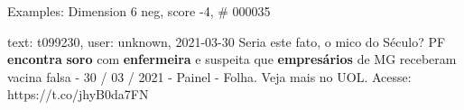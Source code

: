 \begin{frame}{Examples: Dimension 6 neg, score -4, \# 000035}
\footnotesize
\begin{alertblock}{text: t099230, user: unknown, 2021-03-30}
Seria este fato, o mico do Século? PF \textbf{encontra} \textbf{soro} com 
\textbf{enfermeira} e suspeita que \textbf{empresários} de MG receberam vacina 
falsa - 30 / 03 / 2021 - Painel - Folha. Veja mais no UOL. Acesse: 
https://t.co/jhyB0da7FN 
\end{alertblock}
\end{frame}
